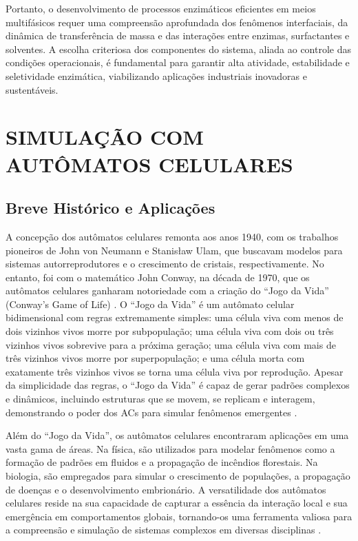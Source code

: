 \documentclass[12pt,oneside]{report}
\begin{document}
Portanto, o desenvolvimento de processos enzimáticos eficientes em meios multifásicos requer uma compreensão aprofundada dos fenômenos interfaciais, da dinâmica de transferência de massa e das interações entre enzimas, surfactantes e solventes. A escolha criteriosa dos componentes do sistema, aliada ao controle das condições operacionais, é fundamental para garantir alta atividade, estabilidade e seletividade enzimática, viabilizando aplicações industriais inovadoras e sustentáveis.

\section{SIMULAÇÃO COM AUTÔMATOS CELULARES}

\subsection{Breve Histórico e Aplicações}

A concepção dos autômatos celulares remonta aos anos 1940, com os trabalhos pioneiros de John von Neumann e Stanisław Ulam, que buscavam modelos para sistemas autorreprodutores e o crescimento de cristais, respectivamente. No entanto, foi com o matemático John Conway, na década de 1970, que os autômatos celulares ganharam notoriedade com a criação do ``Jogo da Vida'' (Conway's Game of Life) \cite{Gardner1970}. O ``Jogo da Vida'' é um autômato celular bidimensional com regras extremamente simples: uma célula viva com menos de dois vizinhos vivos morre por subpopulação; uma célula viva com dois ou três vizinhos vivos sobrevive para a próxima geração; uma célula viva com mais de três vizinhos vivos morre por superpopulação; e uma célula morta com exatamente três vizinhos vivos se torna uma célula viva por reprodução. Apesar da simplicidade das regras, o ``Jogo da Vida'' é capaz de gerar padrões complexos e dinâmicos, incluindo estruturas que se movem, se replicam e interagem, demonstrando o poder dos ACs para simular fenômenos emergentes \cite{Gardner1970}.

Além do ``Jogo da Vida'', os autômatos celulares encontraram aplicações em uma vasta gama de áreas. Na física, são utilizados para modelar fenômenos como a formação de padrões em fluidos e a propagação de incêndios florestais. Na biologia, são empregados para simular o crescimento de populações, a propagação de doenças e o desenvolvimento embrionário. A versatilidade dos autômatos celulares reside na sua capacidade de capturar a essência da interação local e sua emergência em comportamentos globais, tornando-os uma ferramenta valiosa para a compreensão e simulação de sistemas complexos em diversas disciplinas \cite{kier2005}.
\end{document}
